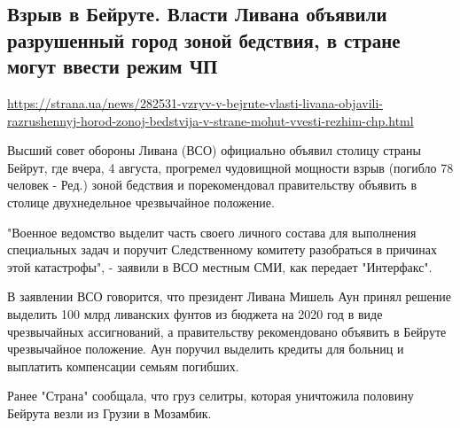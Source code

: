  
 
\subsection{Взрыв в Бейруте. Власти Ливана объявили разрушенный город зоной бедствия, в стране могут ввести режим ЧП}
\label{sec:05_08_2020.news.strana_ua.beirut}
\url{https://strana.ua/news/282531-vzryv-v-bejrute-vlasti-livana-objavili-razrushennyj-horod-zonoj-bedstvija-v-strane-mohut-vvesti-rezhim-chp.html}


Высший совет обороны Ливана (ВСО) официально объявил столицу страны Бейрут, где
вчера, 4 августа, прогремел чудовищной мощности взрыв (погибло 78 человек -
Ред.) зоной бедствия и порекомендовал правительству объявить в столице
двухнедельное чрезвычайное положение.

"Военное ведомство выделит часть своего личного состава для выполнения
специальных задач и поручит Следственному комитету разобраться в причинах этой
катастрофы", - заявили в ВСО  местным СМИ, как передает "Интерфакс".

В заявлении ВСО говорится, что президент Ливана Мишель Аун принял решение
выделить 100 млрд ливанских фунтов из бюджета на 2020 год в виде чрезвычайных
ассигнований, а правительству рекомендовано объявить в Бейруте чрезвычайное
положение. Аун поручил выделить кредиты для больниц и выплатить компенсации
семьям погибших.

Ранее "Страна" сообщала, что груз селитры, которая уничтожила половину Бейрута
везли из Грузии в Мозамбик.
  
